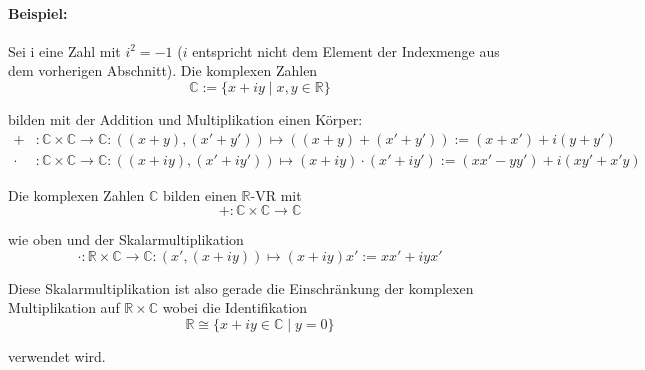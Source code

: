 \documentclass[12pt,a4paper,parskip=half-,DIV=15]{scrreprt}
\begin{document}
\paragraph{Beispiel:} Sei i eine \glqq Zahl\grqq{} mit $i^2=-1$ ($i$ entspricht nicht dem Element der Indexmenge aus dem vorherigen Abschnitt). Die komplexen Zahlen
\begin{equation*}
\mathbb{C}:=\{{x+iy\mid x,y\in \mathbb{R}}\}
\end{equation*}
 
bilden mit der Addition und Multiplikation einen Körper:
\begin{align*}
+&:\mathbb{C}\times \mathbb{C} \to \mathbb{C}: ((x+y),(x'+y')) \mapsto ((x+y)+(x'+y')) := (x+x')+i(y+y')\\
\cdot &:\mathbb{C}\times \mathbb{C} \to \mathbb{C}: ((x+iy),(x'+iy'))\mapsto (x+iy)\cdot (x'+iy') :=(xx'-yy')+i(xy'+x'y)
\end{align*}

Die komplexen Zahlen $\mathbb{C}$ bilden einen $\mathbb{R}$-VR mit
\begin{equation*}
+:\mathbb{C}\times\mathbb{C}\to\mathbb{C}
\end{equation*}

wie oben und der Skalarmultiplikation
\begin{equation*}
\cdot:\mathbb{R}\times\mathbb{C}\to\mathbb{C}:(x',(x+iy))\mapsto(x+iy)x':=xx'+iyx'
\end{equation*}

Diese Skalarmultiplikation ist also gerade die Einschränkung der komplexen Multiplikation auf $\mathbb{R}\times\mathbb{C}$ wobei die Identifikation
\begin{equation*}
\mathbb{R}\cong \{{x+iy\in\mathbb{C}\mid y=0}\}
\end{equation*}

verwendet wird.
\end{document}
